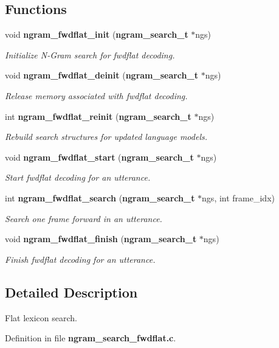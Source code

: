 \subsection*{Functions}
\begin{DoxyCompactItemize}
\item 
void {\bf ngram\-\_\-fwdflat\-\_\-init} ({\bf ngram\-\_\-search\-\_\-t} $\ast$ngs)\label{ngram__search__fwdflat_8c_ad4b8ebd904c77f8a28f59cd5ca2c8307}

\begin{DoxyCompactList}\small\item\em Initialize N-\/\-Gram search for fwdflat decoding. \end{DoxyCompactList}\item 
void {\bf ngram\-\_\-fwdflat\-\_\-deinit} ({\bf ngram\-\_\-search\-\_\-t} $\ast$ngs)\label{ngram__search__fwdflat_8c_a8faf467f90162a7273b23304fc6e8586}

\begin{DoxyCompactList}\small\item\em Release memory associated with fwdflat decoding. \end{DoxyCompactList}\item 
int {\bf ngram\-\_\-fwdflat\-\_\-reinit} ({\bf ngram\-\_\-search\-\_\-t} $\ast$ngs)\label{ngram__search__fwdflat_8c_aa4879c06ddbc455a6f355084a9c574b4}

\begin{DoxyCompactList}\small\item\em Rebuild search structures for updated language models. \end{DoxyCompactList}\item 
void {\bf ngram\-\_\-fwdflat\-\_\-start} ({\bf ngram\-\_\-search\-\_\-t} $\ast$ngs)\label{ngram__search__fwdflat_8c_a763c2c7aaa5d7f9c5107af73552a2149}

\begin{DoxyCompactList}\small\item\em Start fwdflat decoding for an utterance. \end{DoxyCompactList}\item 
int {\bf ngram\-\_\-fwdflat\-\_\-search} ({\bf ngram\-\_\-search\-\_\-t} $\ast$ngs, int frame\-\_\-idx)\label{ngram__search__fwdflat_8c_ae77ef21ae92dbcc4b14f40469fbd4307}

\begin{DoxyCompactList}\small\item\em Search one frame forward in an utterance. \end{DoxyCompactList}\item 
void {\bf ngram\-\_\-fwdflat\-\_\-finish} ({\bf ngram\-\_\-search\-\_\-t} $\ast$ngs)\label{ngram__search__fwdflat_8c_ac855cf540ac4acdfa320629720ded6fe}

\begin{DoxyCompactList}\small\item\em Finish fwdflat decoding for an utterance. \end{DoxyCompactList}\end{DoxyCompactItemize}


\subsection{Detailed Description}
Flat lexicon search. 

Definition in file {\bf ngram\-\_\-search\-\_\-fwdflat.\-c}.

